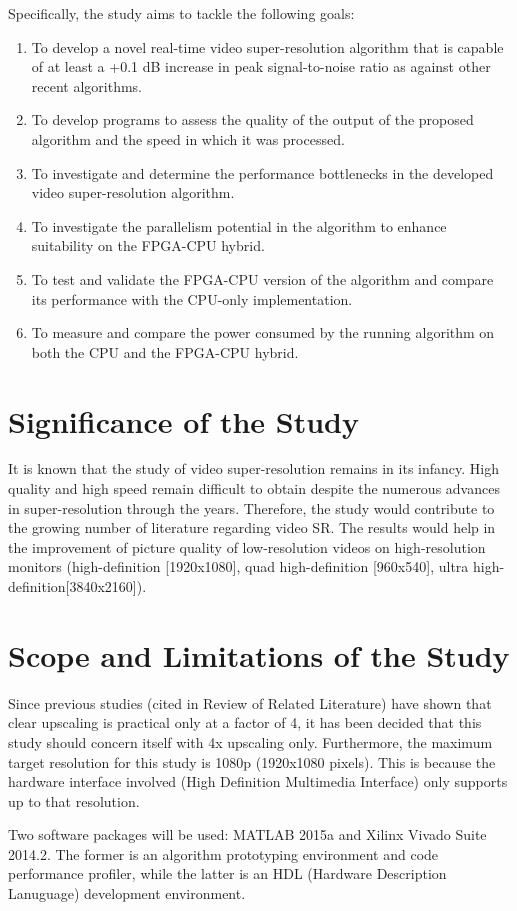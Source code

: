 Specifically, the study aims to tackle the following goals:

\begin{enumerate}

	\item To develop a novel real-time video super-resolution algorithm that is capable of at least a +0.1 dB increase in peak signal-to-noise ratio as against other recent algorithms. 
	\item To develop programs to assess the quality of the output of the proposed algorithm and the speed in which it was processed.
	\item To investigate and determine the performance bottlenecks in the developed video super-resolution algorithm.
	\item To investigate the parallelism potential in the algorithm to enhance suitability on the FPGA-CPU hybrid.
	\item To test and validate the FPGA-CPU version of the algorithm and compare its performance with the CPU-only implementation.
	\item To measure and compare the power consumed by the running algorithm on both the CPU and the FPGA-CPU hybrid.
\end{enumerate}

\section{Significance of the Study}
It is known that the study of video super-resolution remains in its infancy.
High quality and high speed remain difficult to obtain despite the numerous advances in super-resolution through the years.
Therefore, the study would contribute to the growing number of literature regarding video SR. 	
The results would help in the improvement of picture quality of low-resolution videos on high-resolution monitors (high-definition [1920x1080], quad high-definition [960x540], ultra high-definition[3840x2160]).


\section{Scope and Limitations of the Study}

Since previous studies (cited in Review of Related Literature) have shown that clear upscaling is practical only at a factor of 4, it has been decided that this study should concern itself with 4x upscaling only.
Furthermore, the maximum target resolution for this study is 1080p (1920x1080 pixels). 
This is because the hardware interface involved (High Definition Multimedia Interface) only supports up to that resolution.

Two software packages will be used: MATLAB 2015a and Xilinx Vivado Suite 2014.2.
The former is an algorithm prototyping environment and code performance profiler, while the latter is an HDL (Hardware Description Lanuguage) development environment.

